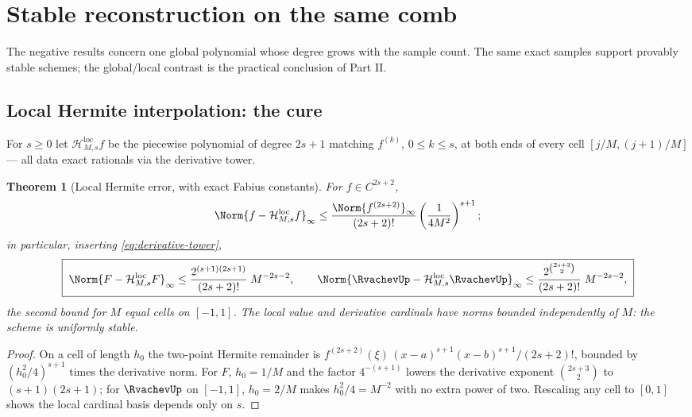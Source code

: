\documentclass[11pt,oneside]{article}
\numberwithin{equation}{section}
\newtheorem{theorem}{Theorem}[section]
\theoremstyle{definition}
\theoremstyle{remark}
\begin{document}
\section{Stable reconstruction on the same comb}
\label{sec:alternatives}

The negative results concern one global polynomial whose degree grows
with the sample count.  The same exact samples support provably
stable schemes; the global/local contrast is the practical conclusion
of Part II.

\subsection{Local Hermite interpolation: the cure}

For $s\ge0$ let $\mathcal H^{\mathrm{loc}}_{M,s}f$ be the piecewise
polynomial of degree $2s+1$ matching $f^{(k)}$, $0\le k\le s$, at both
ends of every cell $[j/M,(j+1)/M]$ --- all data exact rationals via
the derivative tower.

\begin{theorem}[Local Hermite error, with exact Fabius constants]
\label{thm:local-error}
For $f\in C^{2s+2}$,
\begin{equation}
 \Norm{f-\mathcal H^{\mathrm{loc}}_{M,s}f}_\infty
 \le\frac{\Norm{f^{(2s+2)}}_\infty}{(2s+2)!}
 \left(\frac{1}{4M^{2}}\right)^{s+1};
 \label{eq:local-general}
\end{equation}
in particular, inserting \eqref{eq:derivative-tower},
\begin{equation}
 \boxed{\;
 \Norm{F-\mathcal H^{\mathrm{loc}}_{M,s}F}_\infty
 \le\frac{2^{(s+1)(2s+1)}}{(2s+2)!}\;M^{-2s-2},
 \qquad
 \Norm{\RvachevUp-\mathcal H^{\mathrm{loc}}_{M,s}\RvachevUp}_\infty
 \le\frac{2^{\binom{2s+3}{2}}}{(2s+2)!}\;M^{-2s-2},
 \;}
 \label{eq:local-F-bound}
\end{equation}
the second bound for $M$ equal cells on $[-1,1]$.  The local value
and derivative cardinals have norms bounded independently of $M$: the
scheme is uniformly stable.
\end{theorem}

\begin{proof}
On a cell of length $h_0$ the two-point Hermite remainder is
$f^{(2s+2)}(\xi)\,(x-a)^{s+1}(x-b)^{s+1}/(2s+2)!$, bounded by
$(h_0^{2}/4)^{s+1}$ times the derivative norm.  For $F$, $h_0=1/M$
and the factor $4^{-(s+1)}$ lowers the derivative exponent
$\binom{2s+3}2$ to $(s+1)(2s+1)$; for $\RvachevUp$ on $[-1,1]$, $h_0=2/M$
makes $h_0^{2}/4=M^{-2}$ with no extra power of two.  Rescaling any
cell to $[0,1]$ shows the local cardinal basis depends only on $s$.
\end{proof}
\end{document}
